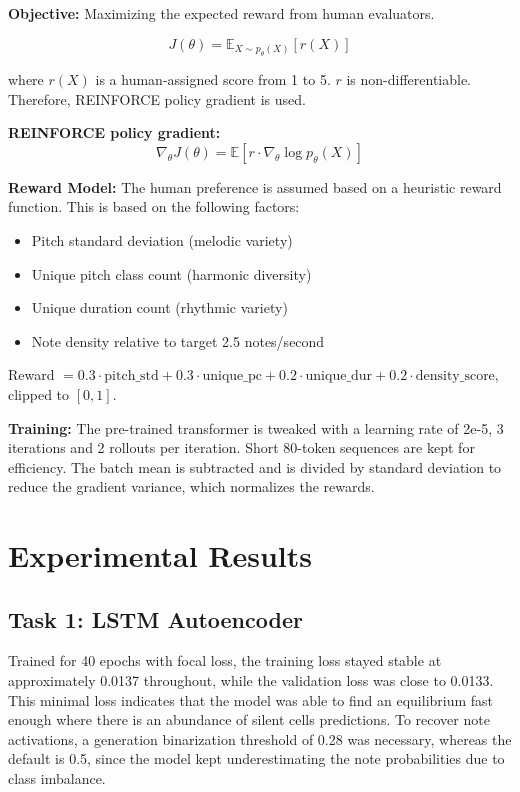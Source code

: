 \documentclass[conference]{IEEEtran}
\begin{document}
\textbf{Objective:} Maximizing the expected reward from human evaluators.

\begin{equation}
J(\theta) = \mathbb{E}_{X \sim p_\theta(X)}[r(X)]
\end{equation}

where $r(X)$ is a human-assigned score from 1 to 5. $r$ is non-differentiable. Therefore, REINFORCE policy gradient is used.

\textbf{REINFORCE policy gradient:}
\begin{equation}
\nabla_\theta J(\theta) = \mathbb{E}[r \cdot \nabla_\theta \log p_\theta(X)]
\end{equation}

\textbf{Reward Model:} The human preference is assumed based on a heuristic reward function. This is based on the following factors:
\begin{itemize}
    \item Pitch standard deviation (melodic variety)
    \item Unique pitch class count (harmonic diversity)
    \item Unique duration count (rhythmic variety)
    \item Note density relative to target 2.5 notes/second
\end{itemize}

Reward $= 0.3 \cdot \text{pitch\_std} + 0.3 \cdot \text{unique\_pc} + 0.2 \cdot \text{unique\_dur} + 0.2 \cdot \text{density\_score}$, clipped to $[0,1]$.

\textbf{Training:} The pre-trained transformer is tweaked with a learning rate of 2e-5, 3 iterations and 2 rollouts per iteration. Short 80-token sequences are kept for efficiency. The batch mean is subtracted and is divided by standard deviation to reduce the gradient variance, which normalizes the rewards.

\section{Experimental Results}

\subsection{Task 1: LSTM Autoencoder}

Trained for 40 epochs with focal loss, the training loss stayed stable at approximately 0.0137 throughout, while the validation loss was close to 0.0133. This minimal loss indicates that the model was able to find an equilibrium fast enough where there is an abundance of silent cells predictions. To recover note activations, a generation binarization threshold of 0.28 was necessary, whereas the default is 0.5, since the model kept underestimating the note probabilities due to class imbalance.
\end{document}
